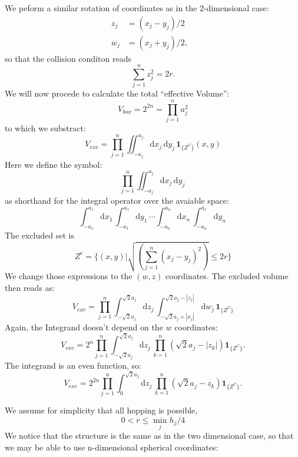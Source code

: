 \documentclass[superscriptaddress,pre,reprint,showpacs,onecolumn]{revtex4-1}
\newcommand{\rd}[1]{\mathrm{d}{#1} \,}
\newcommand{\indicatorsymbol}{\mathbf{1}}
\newcommand{\indicator}[1]{\indicatorsymbol_{ \{   #1 \} } }
\begin{document}
We peform a similar rotation of coordinates as in the 2-dimensional case:
\begin{align}
  z_j & = (x_j-y_j)/2  &\\
  w_j & =(x_j+y_j)/2 , &
\end{align}
so that the collision conditon reads
\begin{equation}
  \sum_{j=1}^n z_j^2=2r.
\end{equation}
We will now procede to calculate the total ``effective Volume'':
\begin{equation}
V_{box}=2^{2n}=\prod_{j=1}^n a_j^2
\end{equation}
to which we substract:
\begin{equation}
  V_{exc}=\prod_{j=1}^n \iint_{-a_j}^{a_j} \rd{x_j} \rd{y_j} \indicator{Z^C} (x,y)
\end{equation}
Here we define the symbol:
\begin{equation*}
  \prod_{j=1}^n\iint_{-a_j}^{a_j} \rd{x_j} \rd{y_j} 
\end{equation*}
as shorthand for the integral operator over the avaiable space:
\begin{equation*}
  \int_{ -a_1 } ^{a_1} \rd{x_1}  \int_{-a_1 }^{a_1} \rd{y_1}
  \cdots
  \int_{-a_n }^{a_n} \rd{x_n}  \int_{-a_n } ^{a_1} \rd{y_n}
\end{equation*}
The excluded set is
\begin{equation}
  Z^c= \biggl\lbrace (x,y) \vert \sqrt{\left( \sum_{j=1}^n (x_j - y_j )^2 \right)} \leq 2 r \biggr\rbrace
\end{equation}
We change those expressions to the $(w, z)$ coordinates. The excluded volume
then reads as:
\begin{equation}
  V_{exc} =  \prod_{j=1}^n \int_{-\sqrt{2}a_j} ^{\sqrt{2}a_j} \rd{z_j}
  \int_{-\sqrt{2}a_j+|x_j|} ^{\sqrt{2}a_j-|z_j|} \rd{w_j} \indicator{Z^C}
\end{equation}
Again, the Integrand doesn't depend on the $w$ coordinates:
\begin{equation}
  V_{exc} = 2^n \prod_{j=1}^n \int_{-\sqrt{2}a_j} ^{\sqrt{2}a_j} \rd{z_j}
  \prod_{k=1}^n (\sqrt{2}a_j-|z_k|) \indicator{Z^C}.
\end{equation}
The integrand is an even function, so:
\begin{equation}
  V_{exc} = 2^{2n} \prod_{j=1}^n \int_{0} ^{\sqrt{2}a_j} \rd{z_j}
  \prod_{k=1}^n (\sqrt{2}a_j-z_k) \indicator{Z^C}.
\end{equation}

We assume for simplicity that all hopping is possible,
\begin{equation}
  0 < r \leq \min_j {h_j/4}
\end{equation}
We notice that the structure is the same as in the two dimensional case,
so that we may be able to use n-dimensional spherical coordinates:
\end{document}
